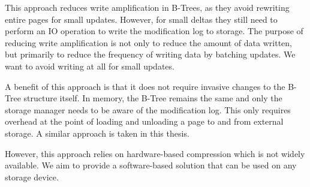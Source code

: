 This approach reduces write amplification in B-Trees, as they avoid rewriting entire pages for small updates.
However, for small deltas they still need to perform an \ac{IO} operation to write the modification log to storage.
The purpose of reducing write amplification is not only to reduce the amount of data written, but primarily to reduce the frequency of writing data by batching updates.
We want to avoid writing at all for small updates.

A benefit of this approach is that it does not require invasive changes to the B-Tree structure itself.
In memory, the B-Tree remains the same and only the storage manager needs to be aware of the modification log.
This only requires overhead at the point of loading and unloading a page to and from external storage.
A similar approach is taken in this thesis.

However, this approach relies on hardware-based compression which is not widely available.
We aim to provide a software-based solution that can be used on any storage device.

    